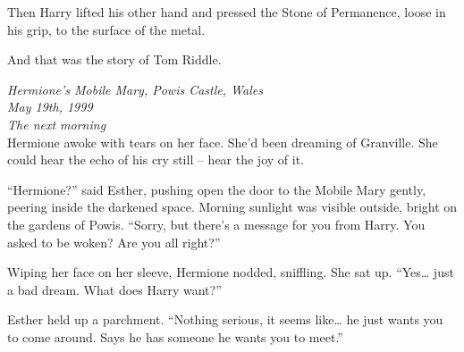 Then Harry lifted his other hand and pressed the Stone of Permanence,
loose in his grip, to the surface of the metal.

And that was the story of Tom Riddle.

\mybreak

\emph{Hermione's Mobile Mary, Powis Castle, Wales}\\
\emph{May 19th, 1999}\\
\emph{The next morning}\\

Hermione awoke with tears on her face. She'd been dreaming of Granville.
She could hear the echo of his cry still -- hear the joy of it.

``Hermione?'' said Esther, pushing open the door to the Mobile Mary
gently, peering inside the darkened space. Morning sunlight was visible
outside, bright on the gardens of Powis. ``Sorry, but there's a message
for you from Harry. You asked to be woken? Are you all right?''

Wiping her face on her sleeve, Hermione nodded, sniffling. She sat up.
``Yes\ldots{} just a bad dream. What does Harry want?''

Esther held up a parchment. ``Nothing serious, it seems like\ldots{} he
just wants you to come around. Says he has someone he wants you to
meet.''
